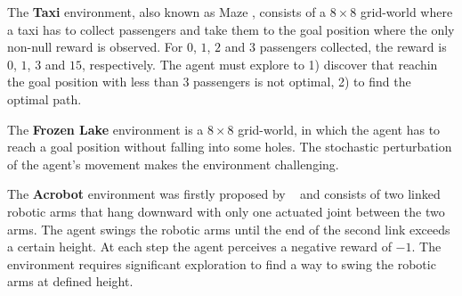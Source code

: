 The \textbf{Taxi} environment, also known as Maze \cite{dearden1998bayesian}, consists of a $8\times 8$ grid-world where a taxi has to collect passengers and take them to the goal position where the only non-null reward is observed. For $0$, $1$, $2$ and $3$ passengers collected, the reward is $0$, $1$, $3$ and $15$, respectively. The agent must explore to 1) discover that reachin the goal position with less than $3$ passengers is not optimal, 2) to find the optimal path.
  
The \textbf{Frozen Lake} environment is a $8\times 8$ grid-world, in which the agent has to reach a goal position without falling into some holes. The stochastic perturbation of the agent's movement makes the environment challenging.

The \textbf{Acrobot} environment was firstly proposed by \citeauthor{sutton1996generalization}~ and consists of two linked robotic arms that hang downward with only one actuated joint between the two arms. The agent swings the robotic arms until the end of the second link exceeds a certain height. At each step the agent perceives a negative reward of $-1$. The environment requires significant exploration to find a way to swing the robotic arms at defined height.


